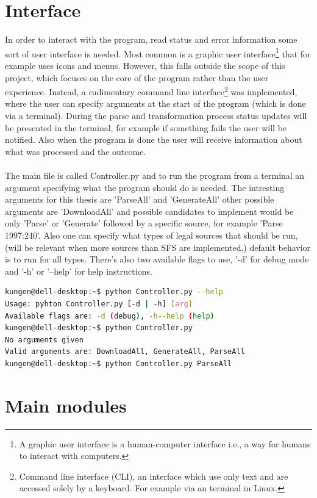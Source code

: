 \documentclass[a4paper,11pt]{kth-mag}
\begin{document}
\section{Interface}
In order to interact with the program, read status and error information some sort of user interface is needed. Most common is a graphic user interface\footnote{A graphic user interface is a human-computer interface i.e., a way for humans to interact with computers.} that for example uses icons and menus. However, this falls outside the scope of this project, which focuses on the core of the program rather than the user experience. Instead, a rudimentary command line interface\footnote{Command line interface (CLI), an interface which use only text and are accessed solely by a keyboard. For example via an terminal in Linux.} was implemented, where the user can specify arguments at the start of the program (which is done via a terminal). During the parse and transformation process status updates will be presented in the terminal, for example if something fails the user will be notified. Also when the program is done the user will receive information about what was processed and the outcome.\\\\
The main file is called Controller.py and to run the program from a terminal an argument specifying what the program should do is needed. The intresting arguments for this thesis are 'ParseAll' and 'GenerateAll' other possible arguments are 'DownloadAll' and possible candidates to implement would be only 'Parse' or 'Generate' followed by a specific source, for example 'Parse 1997:240'. Also one can specify what types of legal sources that should be run, (will be relevant when more sources than SFS are implemented.) default behavior is to run for all types. There's also two available flags to use, '-d' for debug mode and '-h' or '--help' for help instructions.    

\begin{lstlisting}[language=bash, caption=Command to run the program]
kungen@dell-desktop:~$ python Controller.py --help
Usage: pyhton Controller.py [-d | -h] [arg]
Available flags are: -d (debug), -h--help (help)
kungen@dell-desktop:~$ python Controller.py
No arguments given
Valid arguments are: DownloadAll, GenerateAll, ParseAll
kungen@dell-desktop:~$ python Controller.py ParseAll
\end{lstlisting}

\section{Main modules}
\end{document}
